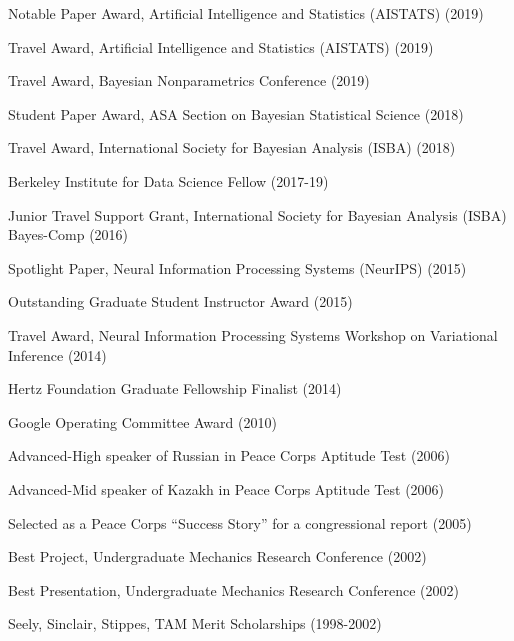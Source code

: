 \documentclass[margin,line]{res}
\newenvironment{list1}{
  \begin{list}{\ding{113}}{%
      \setlength{\itemsep}{0in}
      \setlength{\parsep}{0in} \setlength{\parskip}{0in}
      \setlength{\topsep}{0in} \setlength{\partopsep}{0in}
      \setlength{\leftmargin}{0in}}}{\end{list}} %
\begin{document}
\begin{resume}
\begin{list1}
\item[] Notable Paper Award, Artificial Intelligence and Statistics (AISTATS) (2019)
\item[] Travel Award, Artificial Intelligence and Statistics (AISTATS) (2019)
\item[] Travel Award, Bayesian Nonparametrics Conference (2019)
\item[] Student Paper Award, ASA Section on Bayesian Statistical Science (2018)
\item[] Travel Award, International Society for Bayesian Analysis (ISBA) (2018)
\item[] Berkeley Institute for Data Science Fellow (2017-19)
\item[] Junior Travel Support Grant, International Society for Bayesian Analysis (ISBA) Bayes-Comp (2016)
\item[] Spotlight Paper, Neural Information Processing Systems (NeurIPS) (2015)
\item[] Outstanding Graduate Student Instructor Award (2015)
\item[] Travel Award, Neural Information Processing Systems Workshop on Variational Inference (2014)
\item[] Hertz Foundation Graduate Fellowship Finalist (2014)
\item[] Google Operating Committee Award (2010)
\item[] Advanced-High speaker of Russian in Peace Corps Aptitude Test (2006)
\item[] Advanced-Mid speaker of Kazakh in Peace Corps Aptitude Test (2006)
\item[] Selected as a Peace Corps ``Success Story'' for a congressional report (2005)
\item[] Best Project, Undergraduate Mechanics Research Conference (2002)
\item[] Best Presentation, Undergraduate Mechanics Research Conference (2002)
\item[] Seely, Sinclair, Stippes, TAM Merit Scholarships (1998-2002)




\end{list1}



%
%


\end{resume}
\end{document}
